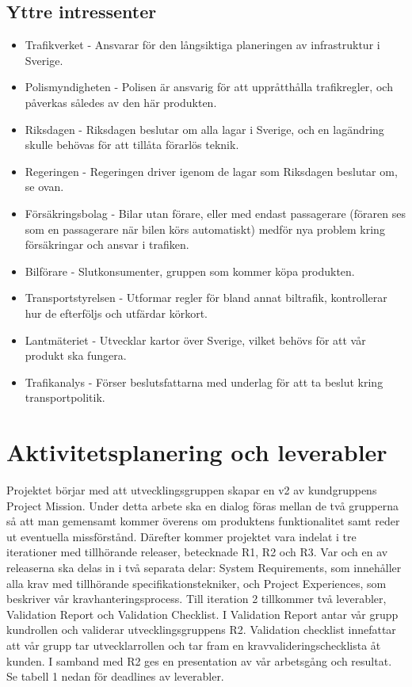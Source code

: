 \documentclass[10pt]{article}
\begin{document}
\subsection{Yttre intressenter}
\noindent
\begin{itemize}
	\setlength\itemsep{0.1em}
	\item Trafikverket - Ansvarar för den långsiktiga planeringen av infrastruktur i Sverige.
	\item Polismyndigheten - Polisen är ansvarig för att uppråtthålla trafikregler, och påverkas således av den här produkten.
	\item Riksdagen - Riksdagen beslutar om alla lagar i Sverige, och en lagändring skulle behövas för att tillåta förarlös teknik.
	\item Regeringen - Regeringen driver igenom de lagar som Riksdagen beslutar om, se ovan.
	\item Försäkringsbolag - Bilar utan förare, eller med endast passagerare (föraren ses som en passagerare när bilen körs automatiskt) medför nya problem kring försäkringar och ansvar i trafiken.
	\item Bilförare - Slutkonsumenter, gruppen som kommer köpa produkten.
	\item Transportstyrelsen - Utformar regler för bland annat biltrafik, kontrollerar hur de efterföljs och utfärdar körkort.
	\item Lantmäteriet - Utvecklar kartor över Sverige, vilket behövs för att vår produkt ska fungera.
	\item Trafikanalys - Förser beslutsfattarna med underlag för att ta beslut kring transportpolitik.
\end{itemize}

\section{Aktivitetsplanering och leverabler}
\sloppy
\noindent
Projektet börjar med att utvecklingsgruppen skapar en v2 av kundgruppens Project Mission. Under detta arbete ska en dialog föras mellan de två grupperna så att man gemensamt kommer överens om produktens funktionalitet samt reder ut eventuella missförstånd.  
Därefter kommer projektet vara indelat i tre iterationer med tillhörande releaser, betecknade R1, R2 och R3. Var och en av releaserna ska delas in i två separata delar: System Requirements, som innehåller alla krav med tillhörande specifikationstekniker, och Project Experiences, som beskriver vår kravhanteringsprocess. Till iteration 2 tillkommer två leverabler, Validation Report och Validation Checklist. I Validation Report antar vår grupp kundrollen och validerar utvecklingsgruppens R2. Validation checklist innefattar att vår grupp tar utvecklarrollen och tar fram en kravvalideringschecklista åt kunden. I samband med R2 ges en presentation av vår arbetsgång och resultat. Se tabell 1 nedan för deadlines av leverabler.  
\end{document}
